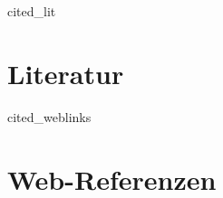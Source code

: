 \thispagestyle{empty}




\begin{btSect}[plain]{cited_lit}
\section*{Literatur}
\setlength{\bibhang}{2em}
\btPrintCited
\end{btSect}

\nocite{*} 
\begin{btSect}[plain]{cited_weblinks}
\section*{Web-Referenzen}
\setlength{\bibhang}{2em}
\btPrintCited
\end{btSect}
